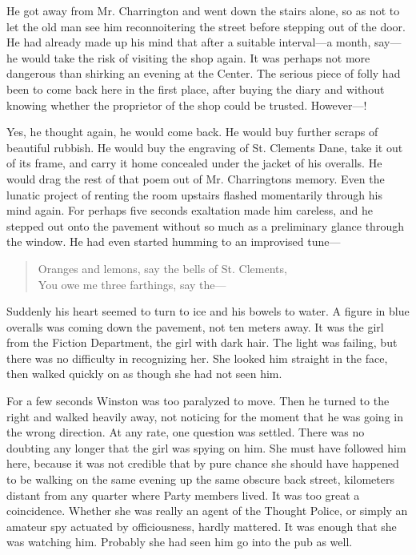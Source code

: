 He got away from Mr. Charrington and went down the stairs alone, so as
not to let the old man see him reconnoitering the street before stepping
out of the door. He had already made up his mind that after a suitable
interval---a month, say---he would take the risk of visiting the shop
again. It was perhaps not more dangerous than shirking an evening at the
Center. The serious piece of folly had been to come back here in the
first place, after buying the diary and without knowing whether the
proprietor of the shop could be trusted. However---!

Yes, he thought again, he would come back. He would buy further scraps
of beautiful rubbish. He would buy the engraving of St.
Clement\textquotesingle s Dane, take it out of its frame, and carry it
home concealed under the jacket of his overalls. He would drag the rest
of that poem out of Mr. Charrington\textquotesingle s memory. Even the
lunatic project of renting the room upstairs flashed momentarily through
his mind again. For perhaps five seconds exaltation made him careless,
and he stepped out onto the pavement without so much as a preliminary
glance through the window. He had even started humming to an improvised
tune---

\begin{quotation}
Oranges and lemons, say the bells of St.
Clement\textquotesingle s,\\
You owe me three farthings, say the---\\
\end{quotation}

Suddenly his heart seemed to turn to ice and his bowels to water. A
figure in blue overalls was coming down the pavement, not ten meters
away. It was the girl from the Fiction Department, the girl with dark
hair. The light was failing, but there was no difficulty in recognizing
her. She looked him straight in the face, then walked quickly on as
though she had not seen him.

For a few seconds Winston was too paralyzed to move. Then he turned to
the right and walked heavily away, not noticing for the moment that he
was going in the wrong direction. At any rate, one question was settled.
There was no doubting any longer that the girl was spying on him. She
must have followed him here, because it was not credible that by pure
chance she should have happened to be walking on the same evening up the
same obscure back street, kilometers distant from any quarter where
Party members lived. It was too great a coincidence. Whether she was
really an agent of the Thought Police, or simply an amateur spy actuated
by officiousness, hardly mattered. It was enough that she was watching
him. Probably she had seen him go into the pub as well.

